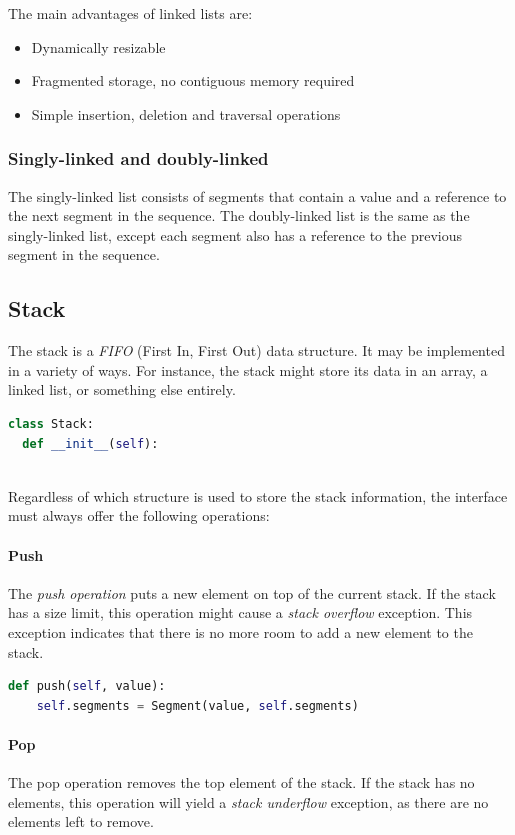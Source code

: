 \documentclass{article}
\begin{document}
The main advantages of linked lists are:
\begin{itemize}
\item Dynamically resizable
\item Fragmented storage, no contiguous memory required
\item Simple insertion, deletion and traversal operations
\end{itemize}

\subsubsection{Singly-linked and doubly-linked}
The singly-linked list consists of segments that contain a value and a reference to the next segment in the sequence.
The doubly-linked list is the same as the singly-linked list, except each segment also has a reference to the previous segment in the sequence.

\subsection{Stack}
The stack is a {\em FIFO} (First In, First Out) data structure.
It may be implemented in a variety of ways. For instance, the stack might store its data in an array, a linked list, or something else entirely.

\begin{lstlisting}[language=Python]
  class Stack:
  def __init__(self):
    
\end{lstlisting}

Regardless of which structure is used to store the stack information, the interface must always offer the following operations:

\paragraph{Push}
The {\em push operation} puts a new element on top of the current stack.
If the stack has a size limit, this operation might cause a {\em stack overflow} exception.
This exception indicates that there is no more room to add a new element to the stack.

\begin{lstlisting}[language=Python]
  def push(self, value):
    self.segments = Segment(value, self.segments)
\end{lstlisting}

\paragraph{Pop}
The pop operation removes the top element of the stack. If the stack has no elements, this operation will yield a {\em stack underflow} exception,
as there are no elements left to remove.
\end{document}
